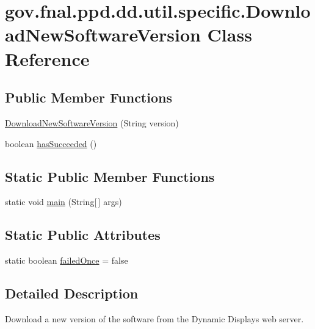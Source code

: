 \hypertarget{classgov_1_1fnal_1_1ppd_1_1dd_1_1util_1_1specific_1_1DownloadNewSoftwareVersion}{\section{gov.\-fnal.\-ppd.\-dd.\-util.\-specific.\-Download\-New\-Software\-Version Class Reference}
\label{classgov_1_1fnal_1_1ppd_1_1dd_1_1util_1_1specific_1_1DownloadNewSoftwareVersion}
}
\subsection*{Public Member Functions}
\begin{DoxyCompactItemize}
\item 
\hyperlink{classgov_1_1fnal_1_1ppd_1_1dd_1_1util_1_1specific_1_1DownloadNewSoftwareVersion_aed7d60f60522451adf764990637ae1ef}{Download\-New\-Software\-Version} (String version)
\item 
boolean \hyperlink{classgov_1_1fnal_1_1ppd_1_1dd_1_1util_1_1specific_1_1DownloadNewSoftwareVersion_af9bd5dfe829e6225143cf18f0609d11f}{has\-Succeeded} ()
\end{DoxyCompactItemize}
\subsection*{Static Public Member Functions}
\begin{DoxyCompactItemize}
\item 
static void \hyperlink{classgov_1_1fnal_1_1ppd_1_1dd_1_1util_1_1specific_1_1DownloadNewSoftwareVersion_a869317adac0a58c0375b20380d56f93c}{main} (String\mbox{[}$\,$\mbox{]} args)
\end{DoxyCompactItemize}
\subsection*{Static Public Attributes}
\begin{DoxyCompactItemize}
\item 
static boolean \hyperlink{classgov_1_1fnal_1_1ppd_1_1dd_1_1util_1_1specific_1_1DownloadNewSoftwareVersion_ae1d1303e595c02f2a8f6879a90b035e0}{failed\-Once} = false
\end{DoxyCompactItemize}


\subsection{Detailed Description}
Download a new version of the software from the Dynamic Displays web server.

